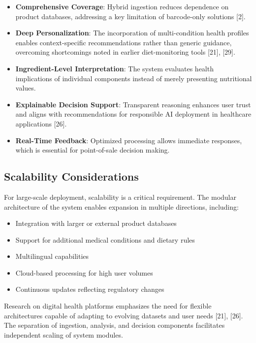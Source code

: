 \documentclass[conference]{IEEEtran}
\begin{document}
\begin{itemize}
    \item \textbf{Comprehensive Coverage}: Hybrid ingestion reduces dependence on product databases, addressing a key limitation of barcode-only solutions [2].
    \item \textbf{Deep Personalization}: The incorporation of multi-condition health profiles enables context-specific recommendations rather than generic guidance, overcoming shortcomings noted in earlier diet-monitoring tools [21], [29].
    \item \textbf{Ingredient-Level Interpretation}: The system evaluates health implications of individual components instead of merely presenting nutritional values.
    \item \textbf{Explainable Decision Support}: Transparent reasoning enhances user trust and aligns with recommendations for responsible AI deployment in healthcare applications [26].
    \item \textbf{Real-Time Feedback}: Optimized processing allows immediate responses, which is essential for point-of-sale decision making.
\end{itemize}

\subsection{Scalability Considerations}

For large-scale deployment, scalability is a critical requirement. The modular architecture of the system enables expansion in multiple directions, including:

\begin{itemize}
    \item Integration with larger or external product databases
    \item Support for additional medical conditions and dietary rules
    \item Multilingual capabilities
    \item Cloud-based processing for high user volumes
    \item Continuous updates reflecting regulatory changes
\end{itemize}

Research on digital health platforms emphasizes the need for flexible architectures capable of adapting to evolving datasets and user needs [21], [26]. The separation of ingestion, analysis, and decision components facilitates independent scaling of system modules.
\end{document}
